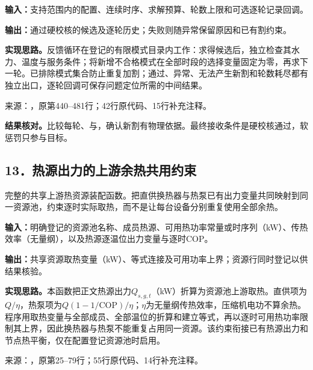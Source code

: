 \noindent\textbf{输入：}支持范围内的配置、连续时序、求解预算、轮数上限和可选逐轮记录回调。\par
\noindent\textbf{输出：}通过硬校核的候选及逐轮历史；失败则随异常保留原因和已有割约束。\par

\noindent\textbf{实现思路。}反馈循环在登记的有限模式目录内工作：求得候选后，独立检查其水力、温度与服务条件；将新增不合格模式在全部时段的选择变量固定为零，再求下一轮。已排除模式集合防止重复加割；通过、异常、无法产生新割和轮数耗尽都有独立出口，逐轮回调可保存问题定位所需的中间结果。

{\small 来源：，原第440--481行；42行原代码、15行补充注释。}\par

\begingroup
{}

\endgroup

\noindent\textbf{结果核对。}比较每轮、与，确认新割有物理依据。最终接收条件是硬校核通过，软惩罚只参与目标。

\subsection*{13．热源出力的上游余热共用约束}
完整的共享上游热资源装配函数。把直供换热器与热泵已有出力变量共同映射到同一资源池，约束逐时实际取热，而不是让每台设备分别重复使用全部余热。

\noindent\textbf{输入：}明确登记的资源池名称、成员热源、可用热功率常量或时序列（kW）、传热效率（无量纲），以及热源逐温位出力变量与逐时COP。\par
\noindent\textbf{输出：}共享资源取热变量（kW）、等式连接及可用功率上界；资源行同时登记以供结果核验。\par

\noindent\textbf{实现思路。}本函数把正文热源出力$Q_{s,g,t}$（kW）折算为资源池上游取热。直供项为$Q/\eta$，热泵项为$Q(1-1/\mathrm{COP})/\eta$；$\eta$为无量纲传热效率，压缩机电功不算余热。程序用取热变量与全部成员、全部温位的折算和建立等式，再以逐时可用热功率限制其上界，因此换热器与热泵不能重复占用同一资源。该约束衔接已有热源出力和节点热平衡，仅在配置登记资源池时启用。

{\small 来源：，原第25--79行；55行原代码、14行补充注释。}\par

\begingroup
{}

\endgroup

